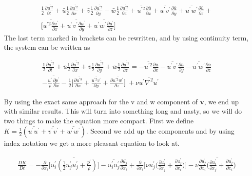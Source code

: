 \documentclass[a4paper,norsk]{article}
\begin{document}
\begin{itemize}
\begin{align*}
\frac{1}{2} \frac{\partial \overline{u^{\prime 2}}}{\partial t} + \bar{u}\frac{1}{2} \frac{\partial \overline{
u^{\prime2}}}{\partial x} + \bar{v}\frac{1}{2}\frac{\partial \overline{u^{\prime2}}}{\partial y} + 
\bar{w}\frac{1}{2}\frac{\partial \overline{u^{\prime2}}}{\partial z} + \overline{u^{\prime 2}} 
\frac{\partial \bar{u}}{\partial x} + \overline{u^\prime v^\prime} \frac{\partial \bar{u}}{\partial y} + 
\overline{u^\prime w^\prime} \frac{\partial \bar{u}}{\partial z} + \\ \Big[
 \overline{u^{\prime 2} \frac{\partial u^\prime}{\partial x}} +  \overline{u^\prime v^\prime \frac{\partial u^\prime}{\partial y}} +  \overline{u^\prime w^\prime \frac{\partial u^\prime}{\partial z}} \Big]  
\end{align*}
The last term marked in brackets can be rewritten, and by using continuity term, the system can be written as

\begin{align*}
\frac{1}{2} \frac{\partial \overline{u^{\prime 2}}}{\partial t} + \bar{u}\frac{1}{2} \frac{\partial \overline{
u^{\prime2}}}{\partial x} + \bar{v}\frac{1}{2}\frac{\partial \overline{u^{\prime2}}}{\partial y} + 
\bar{w}\frac{1}{2}\frac{\partial \overline{u^{\prime2}}}{\partial z} = -\overline{u^{\prime 2}} 
\frac{\partial \bar{u}}{\partial x} - \overline{u^\prime v^\prime} \frac{\partial \bar{u}}{\partial y} - 
\overline{u^\prime w^\prime} \frac{\partial \bar{u}}{\partial z} \\
-\overline{\frac{u^\prime}{\rho} \frac{\partial p^\prime}{\partial x}} - \frac{1}{2}\Big[\frac{\partial 
\overline{u^{\prime 3}}}{\partial x} + \frac{\overline{u^{\prime 2}v^\prime}}{\partial y} +
\frac{\partial \overline{u^{\prime 2}w^\prime}}{\partial z}  \Big] \ + \nu \overline{u^\prime \nabla^2 u^\prime}
\end{align*} 


By using the exact same approach for the v and w component of $\mathbf{v}$, we end up with similar results. This will turn into something long and nasty, so we will do two things to make the equation more compact. First we define
$K = \frac{1}{2}(\overline{u^\prime u^\prime}+\overline{v^\prime v^\prime}+\overline{w^\prime w^\prime})$. Second we add up the components and by using index notation we get a more pleasant equation to look at.

\begin{align*}
\frac{DK}{Dt} = -\frac{\partial}{\partial x_i} \Big[\overline{ u^\prime_i (\frac{1}{2}u^\prime_j u^\prime_j + \frac{p^\prime}{\rho} ) }\Big] - \overline{u^\prime_i u^\prime_j} \frac{\partial \bar{u_j}}{\partial x_i} +
\frac{\partial}{\partial x_i} \Big[\nu u^\prime_j \Big(\frac{\partial u^\prime_i}{\partial x_j} +
\frac{\partial u^\prime_j}{\partial x_i} \Big) \Big] - \nu \overline{\frac{\partial u^\prime_j}{\partial x_i} 
\Big(\frac{\partial u^\prime_i}{\partial x_j} + \frac{\partial u^\prime_j}{\partial x_i} \Big)}
\end{align*}

\end{itemize}
\end{document}
